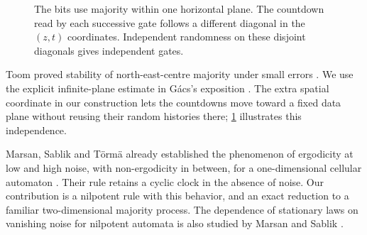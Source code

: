 \documentclass[11pt]{article}
\theoremstyle{plain}
\theoremstyle{definition}
\theoremstyle{remark}
\newcommand{\Maj}{\operatorname{Maj}}
\begin{document}
\begin{figure}[t]
\centering
{}
\caption{The bits use majority within one horizontal plane. The countdown read by each successive gate follows a different diagonal in the $(z,t)$ coordinates. Independent randomness on these disjoint diagonals gives independent gates.}
\label{fig:mechanism}
\end{figure}

Toom proved stability of north-east-centre majority under small errors \cite{Toom80}. We use the explicit infinite-plane estimate in G\'acs's exposition \cite{Gacs21}. The extra spatial coordinate in our construction lets the countdowns move toward a fixed data plane without reusing their random histories there; \cref{fig:mechanism} illustrates this independence.

Marsan, Sablik and T\"orm\"a already established the phenomenon of ergodicity at low and high noise, with non-ergodicity in between, for a one-dimensional cellular automaton \cite{MST26}. Their rule retains a cyclic clock in the absence of noise. Our contribution is a nilpotent rule with this behavior, and an exact reduction to a familiar two-dimensional majority process. The dependence of stationary laws on vanishing noise for nilpotent automata is also studied by Marsan and Sablik \cite{MS24}.
\end{document}

